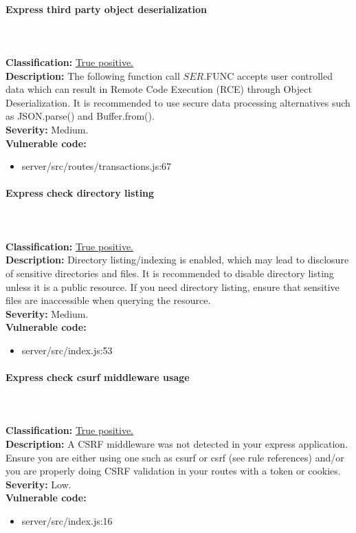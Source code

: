 \documentclass[]{article}
\begin{document}
\paragraph{Express third party object deserialization} \mbox{} \\ \\
\textbf{Classification:} \hyperref[subsubsec:deserialization_of_untrusted_data]{True positive.} \\ 
\textbf{Description:} The following function call $SER.$FUNC accepts user controlled data which 
can result in Remote Code Execution (RCE) through Object Deserialization. It is recommended to 
use secure data processing alternatives such as JSON.parse() and Buffer.from(). \\ 
\textbf{Severity:} Medium. \\ 
\textbf{Vulnerable code:} 
\begin{itemize}
    \item server/src/routes/transactions.js:67
\end{itemize}

\paragraph{Express check directory listing} \mbox{} \\ \\
\textbf{Classification:} \hyperref[subsubsec:exposure_of_information_through_directory_listing]{True positive.} \\ 
\textbf{Description:} Directory listing/indexing is enabled, which may lead to disclosure of sensitive directories 
and files. It is recommended to disable directory listing unless it is a public resource. If you need directory listing, 
ensure that sensitive files are inaccessible when querying the resource. \\ 
\textbf{Severity:} Medium. \\ 
\textbf{Vulnerable code:} 
\begin{itemize}
    \item server/src/index.js:53
\end{itemize}

\paragraph{Express check csurf middleware usage} \mbox{} \\ \\
\textbf{Classification:} \hyperref[subsubsec:csrf_with_samesite_none_misconfiguration]{True positive.} \\ 
\textbf{Description:} A CSRF middleware was not detected in your express application. Ensure you are either using 
one such as csurf or csrf (see rule references) and/or you are properly doing CSRF validation in your routes with 
a token or cookies.\\ 
\textbf{Severity:} Low. \\ 
\textbf{Vulnerable code:} 
\begin{itemize}
    \item server/src/index.js:16
\end{itemize}
\end{document}
